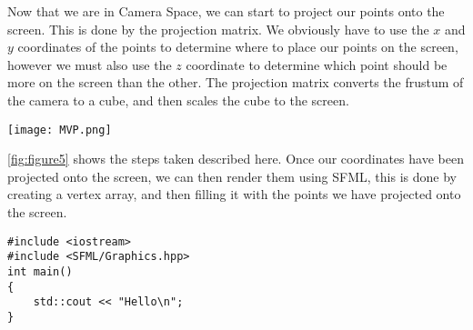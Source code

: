 \documentclass[main.tex]{subfiles}
\begin{document}
Now that we are in Camera Space, we can start to project our points onto the screen. This is done by the projection matrix.
We obviously have to use the $x$ and $y$ coordinates of the points to determine where to place our points on the screen, however 
we must also use the $z$ coordinate to determine which point should be more on the screen than the other.
The projection matrix converts the frustum of the camera to a cube, and then scales the cube to the screen.
\begin{figure*}\texttt{[image: MVP.png]}\caption{shows the steps taken to get screen coordinates}\label{fig:figure5}\end{figure*}
\ref{fig:figure5} shows the steps taken described here.
Once our coordinates have been projected onto the screen, we can then render them using SFML\@, this is done by creating a vertex array, and then
filling it with the points we have projected onto the screen.
\begin{lstlisting}
#include <iostream>
#include <SFML/Graphics.hpp>
int main()
{
    std::cout << "Hello\n"; 
}
\end{lstlisting}
\end{document}
